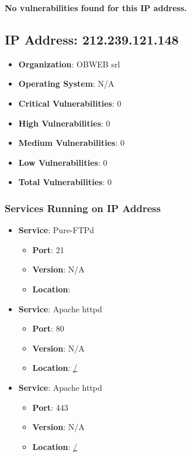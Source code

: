 \documentclass{article}
\begin{document}
\textbf{No vulnerabilities found for this IP address.}




\clearpage



\subsection{IP Address: 212.239.121.148}

\begin{itemize}
    \item \textbf{Organization}: OBWEB srl
    \item \textbf{Operating System}:  N/A 
    \item \textbf{Critical Vulnerabilities}: 0
    \item \textbf{High Vulnerabilities}: 0
    \item \textbf{Medium Vulnerabilities}: 0
    \item \textbf{Low Vulnerabilities}: 0
    \item \textbf{Total Vulnerabilities}: 0
\end{itemize}

\subsubsection*{Services Running on IP Address}

\begin{itemize}
    
        \item \textbf{Service}: Pure-FTPd
        \begin{itemize}
            \item \textbf{Port}: 21
            \item \textbf{Version}:  N/A 
            \item \textbf{Location}: \href{  }{  }
        \end{itemize}
    
        \item \textbf{Service}: Apache httpd
        \begin{itemize}
            \item \textbf{Port}: 80
            \item \textbf{Version}:  N/A 
            \item \textbf{Location}: \href{ / }{ / }
        \end{itemize}
    
        \item \textbf{Service}: Apache httpd
        \begin{itemize}
            \item \textbf{Port}: 443
            \item \textbf{Version}:  N/A 
            \item \textbf{Location}: \href{ / }{ / }
        \end{itemize}
    
\end{itemize}
\end{document}
